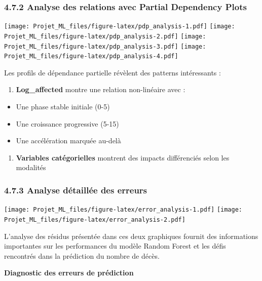 \documentclass[
]{article}
\providecommand{\tightlist}{%
  \setlength{\itemsep}{0pt}\setlength{\parskip}{0pt}}
\begin{document}
\subsubsection{4.7.2 Analyse des relations avec Partial Dependency
Plots}\label{analyse-des-relations-avec-partial-dependency-plots}

\texttt{[image: Projet\_ML\_files/figure-latex/pdp\_analysis-1.pdf]}
\texttt{[image: Projet\_ML\_files/figure-latex/pdp\_analysis-2.pdf]}
\texttt{[image: Projet\_ML\_files/figure-latex/pdp\_analysis-3.pdf]}
\texttt{[image: Projet\_ML\_files/figure-latex/pdp\_analysis-4.pdf]}

Les profils de dépendance partielle révèlent des patterns intéressants :

\begin{enumerate}
\def\labelenumi{\arabic{enumi}.}
\tightlist
\item
  \textbf{Log\_affected} montre une relation non-linéaire avec :
\end{enumerate}

\begin{itemize}
\item
  Une phase stable initiale (0-5)
\item
  Une croissance progressive (5-15)
\item
  Une accélération marquée au-delà
\end{itemize}

\begin{enumerate}
\def\labelenumi{\arabic{enumi}.}
\setcounter{enumi}{1}
\tightlist
\item
  \textbf{Variables catégorielles} montrent des impacts différenciés
  selon les modalités
\end{enumerate}

\subsubsection{4.7.3 Analyse détaillée des
erreurs}\label{analyse-duxe9tailluxe9e-des-erreurs}

\texttt{[image: Projet\_ML\_files/figure-latex/error\_analysis-1.pdf]}
\texttt{[image: Projet\_ML\_files/figure-latex/error\_analysis-2.pdf]}

L'analyse des résidus présentée dans ces deux graphiques fournit des
informations importantes sur les performances du modèle Random Forest et
les défis rencontrés dans la prédiction du nombre de décès.

\textbf{Diagnostic des erreurs de prédiction}
\end{document}
